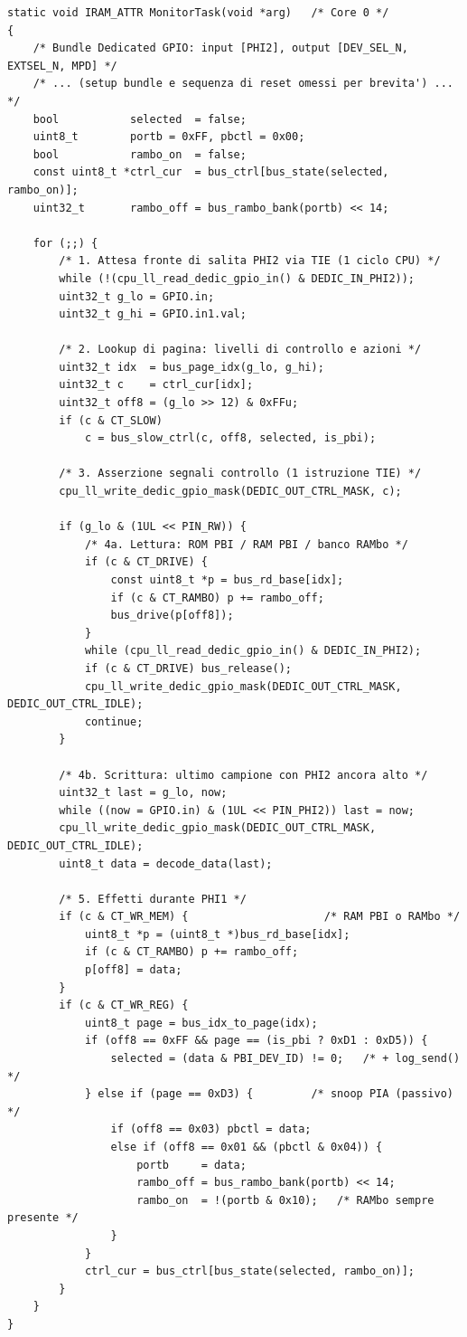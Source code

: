 \documentclass[12pt, a4paper]{article}
\begin{document}
\begin{lstlisting}[style=cppstyle, caption={Nucleo del MonitorTask -- hot loop semplificato (PBI + RAMbo)}, label=code:monitor_task]
static void IRAM_ATTR MonitorTask(void *arg)   /* Core 0 */
{
    /* Bundle Dedicated GPIO: input [PHI2], output [DEV_SEL_N, EXTSEL_N, MPD] */
    /* ... (setup bundle e sequenza di reset omessi per brevita') ... */
    bool           selected  = false;
    uint8_t        portb = 0xFF, pbctl = 0x00;
    bool           rambo_on  = false;
    const uint8_t *ctrl_cur  = bus_ctrl[bus_state(selected, rambo_on)];
    uint32_t       rambo_off = bus_rambo_bank(portb) << 14;

    for (;;) {
        /* 1. Attesa fronte di salita PHI2 via TIE (1 ciclo CPU) */
        while (!(cpu_ll_read_dedic_gpio_in() & DEDIC_IN_PHI2));
        uint32_t g_lo = GPIO.in;
        uint32_t g_hi = GPIO.in1.val;

        /* 2. Lookup di pagina: livelli di controllo e azioni */
        uint32_t idx  = bus_page_idx(g_lo, g_hi);
        uint32_t c    = ctrl_cur[idx];
        uint32_t off8 = (g_lo >> 12) & 0xFFu;
        if (c & CT_SLOW)
            c = bus_slow_ctrl(c, off8, selected, is_pbi);

        /* 3. Asserzione segnali controllo (1 istruzione TIE) */
        cpu_ll_write_dedic_gpio_mask(DEDIC_OUT_CTRL_MASK, c);

        if (g_lo & (1UL << PIN_RW)) {
            /* 4a. Lettura: ROM PBI / RAM PBI / banco RAMbo */
            if (c & CT_DRIVE) {
                const uint8_t *p = bus_rd_base[idx];
                if (c & CT_RAMBO) p += rambo_off;
                bus_drive(p[off8]);
            }
            while (cpu_ll_read_dedic_gpio_in() & DEDIC_IN_PHI2);
            if (c & CT_DRIVE) bus_release();
            cpu_ll_write_dedic_gpio_mask(DEDIC_OUT_CTRL_MASK, DEDIC_OUT_CTRL_IDLE);
            continue;
        }

        /* 4b. Scrittura: ultimo campione con PHI2 ancora alto */
        uint32_t last = g_lo, now;
        while ((now = GPIO.in) & (1UL << PIN_PHI2)) last = now;
        cpu_ll_write_dedic_gpio_mask(DEDIC_OUT_CTRL_MASK, DEDIC_OUT_CTRL_IDLE);
        uint8_t data = decode_data(last);

        /* 5. Effetti durante PHI1 */
        if (c & CT_WR_MEM) {                     /* RAM PBI o RAMbo */
            uint8_t *p = (uint8_t *)bus_rd_base[idx];
            if (c & CT_RAMBO) p += rambo_off;
            p[off8] = data;
        }
        if (c & CT_WR_REG) {
            uint8_t page = bus_idx_to_page(idx);
            if (off8 == 0xFF && page == (is_pbi ? 0xD1 : 0xD5)) {
                selected = (data & PBI_DEV_ID) != 0;   /* + log_send() */
            } else if (page == 0xD3) {         /* snoop PIA (passivo) */
                if (off8 == 0x03) pbctl = data;
                else if (off8 == 0x01 && (pbctl & 0x04)) {
                    portb     = data;
                    rambo_off = bus_rambo_bank(portb) << 14;
                    rambo_on  = !(portb & 0x10);   /* RAMbo sempre presente */
                }
            }
            ctrl_cur = bus_ctrl[bus_state(selected, rambo_on)];
        }
    }
}
\end{lstlisting}
\end{document}

